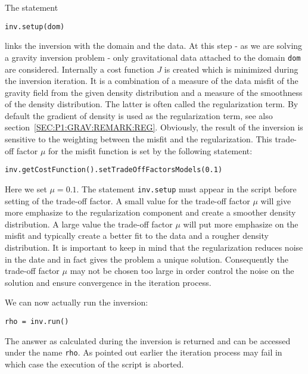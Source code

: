 The statement 
\begin{verbatim}
inv.setup(dom)
\end{verbatim}
links the inversion with the domain and the data. At this step - as we are solving a gravity inversion problem -
only gravitational data attached to the domain \verb|dom| are considered. Internally a cost function $J$
is created which is minimized during the inversion iteration. It is a combination of
a measure of the data misfit of the gravity field from the given density distribution and 
a measure of the smoothness of the density distribution. The latter is often called the regularization term. By default 
the gradient of density is used as the regularization term, see also section~\ref{SEC:P1:GRAV:REMARK:REG}. 
Obviously, the result of the inversion is sensitive to the weighting between the misfit and the regularization. This
trade-off factor $\mu$ for the misfit function is set by the following statement:
\begin{verbatim}
inv.getCostFunction().setTradeOffFactorsModels(0.1) 
\end{verbatim}
Here we set $\mu=0.1$. The statement \verb|inv.setup| must appear in the script before setting of the trade-off factor.
A small value for the trade-off factor $\mu$ will give more emphasize to the regularization component 
and create a smoother density distribution. A large value the trade-off factor $\mu$ will put more emphasize on the
misfit and typically create a better fit to the data and a rougher density distribution. It is important to keep in mind that
the regularization reduces noise in the date and in fact gives the problem a unique solution. Consequently 
the trade-off factor $\mu$ may not be chosen too large in order control the noise on the solution and ensure convergence in
the iteration process.

We can now actually run the inversion:
\begin{verbatim}
rho = inv.run()
\end{verbatim}
The answer as calculated during the inversion is returned and can be accessed under the name \verb|rho|. As pointed out earlier
the iteration process may fail in which case the execution of the script is aborted. 

